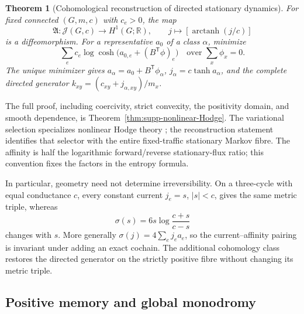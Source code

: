 \documentclass[11pt]{article}
\newtheorem{theorem}{Theorem}[section]
\theoremstyle{definition}
\theoremstyle{remark}
\theoremstyle{definition}
\theoremstyle{remark}
\newcommand{\R}{\mathbb R}
\begin{document}
\begin{theorem}[Cohomological reconstruction of directed stationary dynamics]
\label{thm:summary-affinity}
For fixed connected $(G,m,c)$ with $c_e>0$, the map
\begin{equation}
 \mathfrak A:\mathcal J(G,c)\longrightarrow H^1(G;\R),\qquad
 j\longmapsto[\operatorname{arctanh}(j/c)]
 \label{eq:overview-affinity-diffeomorphism}
\end{equation}
is a diffeomorphism.  For a representative $a_0$ of a class $\alpha$, minimize
\begin{equation}
 \sum_e c_e\log\cosh\bigl(a_{0,e}+(B^{\mathsf T}\phi)_e\bigr)
 \quad\text{over }\sum_x\phi_x=0.
 \label{eq:overview-affinity-minimization}
\end{equation}
The unique minimizer gives $a_\alpha=a_0+B^{\mathsf T}\phi_\alpha$,
$j_\alpha=c\tanh a_\alpha$, and the complete directed generator
$k_{xy}=(c_{xy}+j_{\alpha,xy})/m_x$.
\end{theorem}

The full proof, including coercivity, strict convexity, the positivity domain,
and smooth dependence, is Theorem~\ref{thm:supp-nonlinear-Hodge}.
The variational selection specializes nonlinear Hodge theory
\cite{PardoGuerraThapaWashburn2026}; the reconstruction statement identifies
that selector with the entire fixed-traffic stationary Markov fibre.
The affinity is half the logarithmic forward/reverse stationary-flux ratio;
this convention fixes the factors in the entropy formula.

In particular, geometry need not determine irreversibility.  On a three-cycle
with equal conductance $c$, every constant current $j_e=s$, $|s|<c$, gives the
same metric triple, whereas
\begin{equation}
 \sigma(s)=6s\log\frac{c+s}{c-s}
 \label{eq:overview-cycle-entropy}
\end{equation}
changes with $s$.  More generally $\sigma(j)=4\sum_e j_ea_e$, so the
current--affinity pairing is invariant under adding an exact cochain.
The additional cohomology class restores the directed generator on the
strictly positive fibre without changing its metric triple.

\subsection{Positive memory and global monodromy}
\end{document}
